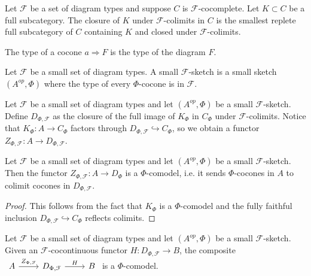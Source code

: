 \begin{definition}

  \noindent Let $\mathcal{F}$ be a set of diagram types and suppose $C$ is
  $\mathcal{F}$-cocomplete. Let $K\subset C$ be a full subcategory. The
  closure of $K$ under $\mathcal{F}$-colimits in $C$ is the smallest replete
  full subcategory of $C$ containing $K$ and closed under
  $\mathcal{F}$-colimits.
\end{definition}

\begin{definition}

  \noindent The type of a cocone $a\Rightarrow F$ is the type of the diagram
  $F$.
\end{definition}

\begin{definition}

  \noindent Let $\mathcal{F}$ be a small set of diagram types. A small
  $\mathcal{F}$-sketch is a small sketch $(A^{op},\Phi)$ where the type of
  every $\Phi$-cocone is in $\mathcal{F}$.
\end{definition}


\begin{definition}

  \noindent Let $\mathcal{F}$ be a small set of diagram types and let
  $(A^{op},\Phi)$ be a small $\mathcal{F}$-sketch. Define
  $D_{\Phi,\mathcal{F}}$ as the closure of the full image of $K_{\Phi}$ in
  $C_{\Phi}$ under $\mathcal{F}$-colimits. Notice that $K_{\Phi}:A\to
  C_{\Phi}$ factors through $D_{\Phi,\mathcal{F}}\hookrightarrow C_{\Phi}$, so
  we obtain a functor $Z_{\Phi,\mathcal{F}}:A\to D_{\Phi,\mathcal{F}}$.
\end{definition}

\begin{lemma}
  Let $\mathcal{F}$ be a small set of diagram types and let $(A^{op},\Phi)$ be
  a small $\mathcal{F}$-sketch. Then the functor $Z_{\Phi,\mathcal{F}}:A\to
  D_{\Phi}$ is a $\Phi$-comodel, i.e. it sends $\Phi$-cocones in $A$ to
  colimit cocones in $D_{\Phi,\mathcal{F}}$.
\end{lemma}

\begin{proof}
  This follows from the fact that $K_{\Phi}$ is a $\Phi$-comodel and the fully
  faithful inclusion $D_{\Phi,\mathcal{F}}\hookrightarrow C_{\Phi}$ reflects
  colimits.
\end{proof}

\begin{lemma}
  Let $\mathcal{F}$ be a small set of diagram types and let $(A^{op},\Phi)$ be
  a small $\mathcal{F}$-sketch. Given an $\mathcal{F}$-cocontinuous functor
  $H:D_{\Phi,\mathcal{F}}\to B$, the composite $
  \begin{tikzcd} A &
    D_{\Phi,\mathcal{F}} & B \arrow["Z_{\Phi,\mathcal{F}}", from=1-1, to=1-2]
    \arrow["H", from=1-2, to=1-3]
  \end{tikzcd}$
  is a $\Phi$-comodel.
\end{lemma}

